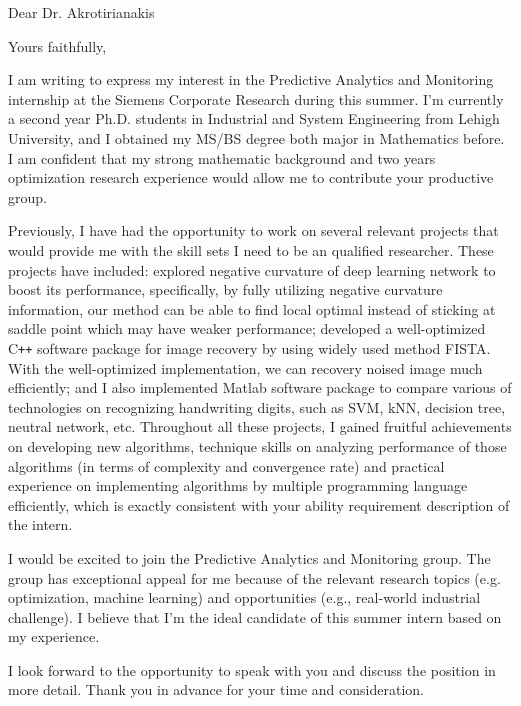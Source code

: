 \documentclass[11pt,a4paper,sans]{moderncv}        %
\begin{document}
\date{\today}
\opening{Dear Dr. Akrotirianakis}
\closing{Yours faithfully,}
\makelettertitle

I am writing to express my interest in the Predictive Analytics and Monitoring internship at the
Siemens Corporate Research during this summer. I'm currently a second year Ph.D. students in Industrial and System Engineering from Lehigh University, 
and I obtained my MS/BS degree both major in Mathematics before. I am confident that my strong mathematic background and two years 
optimization research experience would allow me to contribute your productive group.

Previously, I have had the opportunity to work on several relevant projects that would provide me with
the skill sets I need to be an qualified researcher. These projects have included: explored negative 
curvature of deep learning network to boost its performance, specifically, by fully utilizing negative curvature information, our method can be able to find local optimal instead of sticking at saddle point which may have weaker performance; developed a well-optimized C\texttt{++} software 
package for image recovery by using widely used method FISTA. With the well-optimized implementation, we can recovery noised image much efficiently; and I also implemented Matlab software package to compare various of technologies on recognizing handwriting digits, such as SVM, kNN, decision tree, neutral network, etc. Throughout all these projects, I gained fruitful achievements on developing new algorithms, technique skills on analyzing performance of those algorithms (in terms of complexity and convergence rate) and practical experience on implementing algorithms by multiple programming language efficiently, which is exactly consistent with your ability requirement description of the intern.

I would be excited to join the Predictive Analytics and Monitoring group. The group has exceptional appeal for me
because of the relevant research topics (e.g. optimization, machine learning) and opportunities (e.g., real-world industrial challenge). I believe that I'm the ideal candidate of this summer intern based on my experience.  

I look forward to the opportunity to speak with you and discuss the
position in more detail. Thank you in advance for your time and consideration.

\makeletterclosing
\end{document}
